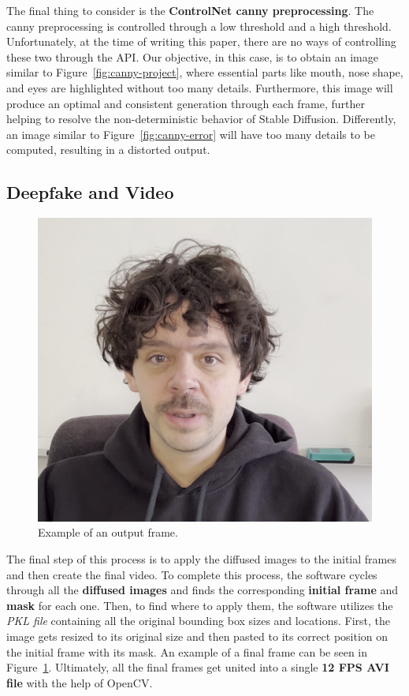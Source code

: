 \documentclass[preprint]{elsarticle}
\begin{document}
The final thing to consider is the \textbf{ControlNet canny preprocessing}. 
The canny preprocessing is controlled through a low threshold and a high threshold. 
Unfortunately, at the time of writing this paper, there are no ways of 
controlling these two through the API.
Our objective, in this case, is to obtain an image similar to Figure~\ref{fig:canny-project}, 
where essential parts like mouth, nose shape, and eyes are highlighted without too many details. 
Furthermore, this image will produce an optimal and consistent generation through each frame, 
further helping to resolve the non-deterministic behavior of Stable Diffusion.
Differently,  an image similar to Figure~\ref{fig:canny-error} will have too many details to be computed, 
resulting in a distorted output.



\subsection{Deepfake and Video}

\begin{figure}[t]
	\centering
	\includegraphics[scale=0.15, keepaspectratio]{img/project_img/output.png}
	\caption{Example of an output frame.}
	\label{fig:output}
\end{figure}

The final step of this process is to apply the diffused images to the initial frames 
and then create the final video. 
To complete this process, the software cycles through all the \textbf{diffused images} 
and finds the corresponding \textbf{initial frame} and \textbf{mask} for each one. 
Then, to find where to apply them, the software utilizes the \emph{PKL file} 
containing all the original bounding box sizes and locations. 
First, the image gets resized to its original size and then pasted 
to its correct position on the initial frame with its mask. 
An example of a final frame can be seen in Figure~\ref{fig:output}.
Ultimately, all the final frames get united into a single \textbf{12 FPS AVI file} with the help of OpenCV.
\end{document}

